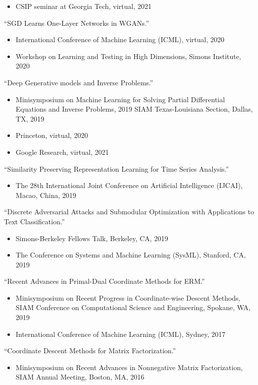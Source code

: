 \documentclass[margin, 10pt]{res} %
\begin{document}
\begin{resume}
{\begin{itemize}[noitemsep,topsep=0pt,parsep=0pt,partopsep=0pt]
	\item CSIP seminar at Georgia Tech, virtual, 2021
\end{itemize}
	 }
{``SGD Learns One-Layer Networks in WGANs.''
  	\begin{itemize}[noitemsep,topsep=0pt,parsep=0pt,partopsep=0pt]
  		\item International Conference of Machine Learning (ICML), virtual, 2020
  		\item Workshop on Learning and Testing in High Dimensions, Simons Institute, 2020
  	\end{itemize} 
  }
{``Deep Generative models and Inverse Problems.''
	\begin{itemize}[noitemsep,topsep=0pt,parsep=0pt,partopsep=0pt]
		\item        Minisymposium on Machine Learning for Solving Partial Differential 
		Equations and Inverse Problems, 2019 SIAM Texas-Louisiana Section, Dallas,
		TX, 2019 
		\item Princeton, virtual, 2020 
		\item  Google Research, virtual, 2021
	\end{itemize}
}


{``Similarity Preserving Representation Learning for Time Series Analysis.''
	\begin{itemize}[noitemsep,topsep=0pt,parsep=0pt,partopsep=0pt]
		\item The 28th International Joint Conference on Artificial Intelligence (IJCAI), Macao, China, 2019
	\end{itemize}
}
{``Discrete Adversarial Attacks 
 and Submodular Optimization with Applications to Text Classification.''
 \begin{itemize}[noitemsep,topsep=0pt,parsep=0pt,partopsep=0pt]
 	\item  Simons-Berkeley Fellows Talk, Berkeley, CA, 2019 
 	\item The Conference on Systems and Machine Learning  (SysML), Stanford, CA, 
 2019
 \end{itemize} 
}
{``Recent 
     Advances in Primal-Dual Coordinate Methods for ERM.''
     \begin{itemize}[noitemsep,topsep=0pt,parsep=0pt,partopsep=0pt]
     	\item      Minisymposium on Recent Progress in Coordinate-wise Descent Methods, SIAM Conference on Computational Science and Engineering, Spokane, WA, 2019
     	\item  International Conference of Machine Learning (ICML), Sydney, 2017  
     \end{itemize}
}
{``Coordinate Descent Methods for Matrix Factorization.''
 	\begin{itemize}[noitemsep,topsep=0pt,parsep=0pt,partopsep=0pt]
 		\item    Minisymposium on Recent Advances in Nonnegative Matrix Factorization, SIAM 
 		Annual Meeting, Boston, MA, 2016
 	\end{itemize}
}



\end{resume}
\end{document}
